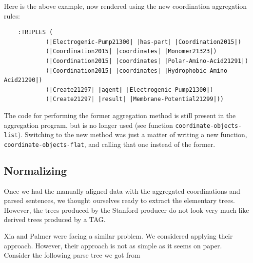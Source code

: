 \documentclass[a4paper]{article}
\begin{document}
Here is the above example, now rendered using the new coordination
aggregation rules:

\begin{verbatim}
    :TRIPLES (
            (|Electrogenic-Pump21300| |has-part| |Coordination2015|)
            (|Coordination2015| |coordinates| |Monomer21323|)
            (|Coordination2015| |coordinates| |Polar-Amino-Acid21291|)
            (|Coordination2015| |coordinates| |Hydrophobic-Amino-Acid21290|)
            (|Create21297| |agent| |Electrogenic-Pump21300|)
            (|Create21297| |result| |Membrane-Potential21299|))
\end{verbatim}

The code for performing the former aggregation method is still present
in the aggregation program, but is no longer used (see function
\texttt{coordinate-objects-list}). Switching to the new method was
just a matter of writing a new function,
\texttt{coordinate-objects-flat}, and calling that one instead of the
former.


\subsection{Normalizing}

Once we had the manually aligned data with the aggregated
coordinations and parsed sentences, we thought ourselves ready to
extract the elementary trees. However, the trees produced by the
Stanford producer do not look very much like derived trees produced by
a TAG.

Xia and Palmer were facing a similar problem\citet{Xia2006}. We
considered applying their approach. However, their approach is not as
simple as it seems on paper. Consider the following parse tree we got
from

\end{document}
